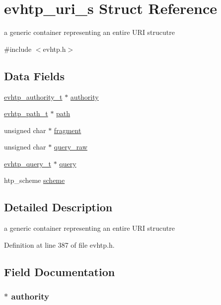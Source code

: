 \hypertarget{structevhtp__uri__s}{\section{evhtp\-\_\-uri\-\_\-s Struct Reference}
\label{structevhtp__uri__s}
}


a generic container representing an entire U\-R\-I strucutre  




{\ttfamily \#include $<$evhtp.\-h$>$}

\subsection*{Data Fields}
\begin{DoxyCompactItemize}
\item 
\hyperlink{evhtp_8h_a8421a0ba0361bdf9fa28292fe4e60a6f}{evhtp\-\_\-authority\-\_\-t} $\ast$ \hyperlink{structevhtp__uri__s_a733fe801dc0ac5ace86975d137f95e90}{authority}
\item 
\hyperlink{evhtp_8h_af31f4c3052c7f4ed6c3bfa32dceb332f}{evhtp\-\_\-path\-\_\-t} $\ast$ \hyperlink{structevhtp__uri__s_af5dec3b872833197fa6e19e681e8a50b}{path}
\item 
unsigned char $\ast$ \hyperlink{structevhtp__uri__s_a3c28c1d14341a7ab7ceb5600b7d353ae}{fragment}
\item 
unsigned char $\ast$ \hyperlink{structevhtp__uri__s_ab78fb0297ee5380de7fe7087c2dada1b}{query\-\_\-raw}
\item 
\hyperlink{evhtp_8h_aed08d04f28beb53e769bc25c2d382765}{evhtp\-\_\-query\-\_\-t} $\ast$ \hyperlink{structevhtp__uri__s_ade25f426b13f051ad7fe2feacbcdf44e}{query}
\item 
htp\-\_\-scheme \hyperlink{structevhtp__uri__s_ad585f48c56bdcc852338aa35466e3f8d}{scheme}
\end{DoxyCompactItemize}


\subsection{Detailed Description}
a generic container representing an entire U\-R\-I strucutre 

Definition at line 387 of file evhtp.\-h.



\subsection{Field Documentation}
\hypertarget{structevhtp__uri__s_a733fe801dc0ac5ace86975d137f95e90}{
\subsubsection[{authority}]{$\ast$ authority}}\label{structevhtp__uri__s_a733fe801dc0ac5ace86975d137f95e90}



